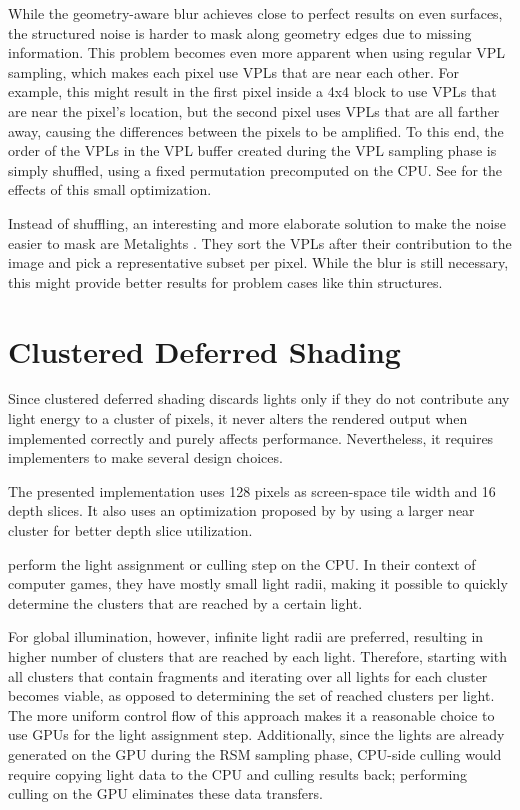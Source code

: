 While the geometry-aware blur achieves close to perfect results on even surfaces, the structured noise is harder to mask along geometry edges due to missing information. This problem becomes even more apparent when using regular VPL sampling, which makes each pixel use VPLs that are near each other. For example, this might result in the first pixel inside a 4x4 block to use VPLs that are near the pixel's location, but the second pixel uses VPLs that are all farther away, causing the differences between the pixels to be amplified. To this end, the order of the VPLs in the VPL buffer created during the VPL sampling phase is simply shuffled, using a fixed permutation precomputed on the CPU. See  for the effects of this small optimization.

Instead of shuffling, an interesting and more elaborate solution to make the noise easier to mask are Metalights \citep{Faure:2010:Metalights}. They sort the VPLs after their contribution to the image and pick a representative subset per pixel. While the blur is still necessary, this might provide better results for problem cases like thin structures.


\section{Clustered Deferred Shading}
\label{sec:impl:clusteredShading}

Since clustered deferred shading discards lights only if they do not contribute any light energy to a cluster of pixels, it never alters the rendered output when implemented correctly and purely affects performance. Nevertheless, it requires implementers to make several design choices.

The presented implementation uses 128 pixels as screen-space tile width and 16 depth slices. It also uses an optimization proposed by \citet{persson::2013::practical} by using a larger near cluster for better depth slice utilization.

\citet{persson::2013::practical} perform the light assignment or culling step on the CPU. In their context of computer games, they have mostly small light radii, making it possible to quickly determine the clusters that are reached by a certain light.

For global illumination, however, infinite light radii are preferred, resulting in higher number of clusters that are reached by each light. Therefore, starting with all clusters that contain fragments and iterating over all lights for each cluster becomes viable, as opposed to determining the set of reached clusters per light. The more uniform control flow of this approach makes it a reasonable choice to use GPUs for the light assignment step. Additionally, since the lights are already generated on the GPU during the RSM sampling phase, CPU-side culling would require copying light data to the CPU and culling results back; performing culling on the GPU eliminates these data transfers.


